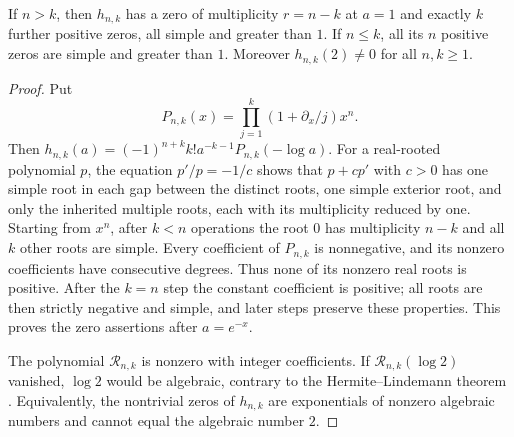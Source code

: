 \begin{lemma}\label{lem:elementary-roots}
If $n>k$, then $h_{n,k}$ has a zero of multiplicity $r=n-k$ at $a=1$
and exactly $k$ further positive zeros, all simple and greater than $1$.
If $n\le k$, all its $n$ positive zeros are simple and greater than $1$.
Moreover $h_{n,k}(2)\ne0$ for all $n,k\ge1$.
\end{lemma}
\begin{proof}
Put
\[
 P_{n,k}(x)=\prod_{j=1}^{k}(1+\partial_x/j)x^n.
\]
Then $h_{n,k}(a)=(-1)^{n+k}k!a^{-k-1}P_{n,k}(-\log a)$.
For a real-rooted polynomial $p$, the equation
$p'/p=-1/c$ shows that $p+cp'$ with $c>0$ has one simple
root in each gap between the distinct roots, one simple exterior root,
and only the inherited multiple roots, each with its multiplicity reduced
by one. Starting from $x^n$, after $k<n$ operations the root $0$ has
multiplicity $n-k$ and all $k$ other roots are simple. Every coefficient
of $P_{n,k}$ is nonnegative, and its nonzero coefficients have consecutive
degrees. Thus none of its nonzero real roots is positive. After the
$k=n$ step the constant coefficient is positive; all roots are then
strictly negative and simple, and later steps preserve these properties.
This proves the zero assertions after $a=e^{-x}$.

The polynomial $\mathscr R_{n,k}$ is nonzero with integer coefficients. If
$\mathscr R_{n,k}(\log2)$ vanished, $\log2$ would be algebraic, contrary to the
Hermite--Lindemann theorem \cite{Baker}. Equivalently, the nontrivial
zeros of $h_{n,k}$ are exponentials of nonzero algebraic numbers and
cannot equal the algebraic number $2$.
\end{proof}

